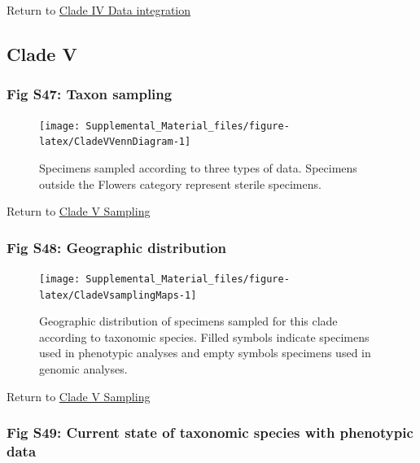\documentclass[
  11pt,
]{article}
\begin{document}
Return to \protect\hyperlink{data-integration-4}{Clade IV Data integration}
\pagebreak

\hypertarget{clade-v-2}{%
\subsection{Clade V}\label{clade-v-2}}

\hypertarget{fig-s47-taxon-sampling}{%
\subsubsection{Fig S47: Taxon sampling}\label{fig-s47-taxon-sampling}}

\begin{figure}

{\centering \texttt{[image: Supplemental\_Material\_files/figure-latex/CladeVVennDiagram-1]} 

}

\caption{Specimens sampled according to three types of data. Specimens outside the Flowers category represent sterile specimens.}\label{fig:CladeVVennDiagram}
\end{figure}

Return to \protect\hyperlink{sampling-5}{Clade V Sampling}
\pagebreak

\hypertarget{fig-s48-geographic-distribution}{%
\subsubsection{Fig S48: Geographic distribution}\label{fig-s48-geographic-distribution}}

\begin{figure}

{\centering \texttt{[image: Supplemental\_Material\_files/figure-latex/CladeVsamplingMaps-1]} 

}

\caption{Geographic distribution of specimens sampled for this clade according to taxonomic species. Filled symbols indicate specimens used in phenotypic analyses and empty symbols specimens used in genomic analyses.}\label{fig:CladeVsamplingMaps}
\end{figure}

Return to \protect\hyperlink{sampling-5}{Clade V Sampling}
\pagebreak

\pagebreak

\hypertarget{fig-s49-current-state-of-taxonomic-species-with-phenotypic-data}{%
\subsubsection{Fig S49: Current state of taxonomic species with phenotypic data}\label{fig-s49-current-state-of-taxonomic-species-with-phenotypic-data}}
\end{document}

